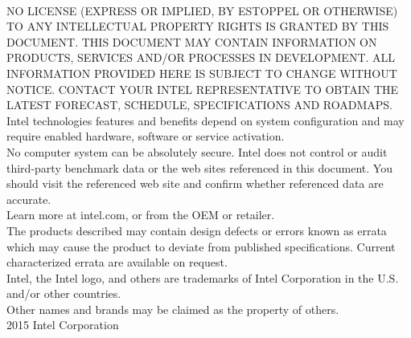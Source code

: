 \newpage

\vspace*{5.0cm}
 \\ 

{\footnotesize

\noindent NO LICENSE (EXPRESS OR IMPLIED, BY ESTOPPEL OR OTHERWISE) TO ANY INTELLECTUAL
PROPERTY RIGHTS IS GRANTED BY THIS DOCUMENT. THIS DOCUMENT MAY CONTAIN
INFORMATION ON PRODUCTS, SERVICES AND/OR PROCESSES IN DEVELOPMENT. ALL
INFORMATION PROVIDED HERE IS SUBJECT TO CHANGE WITHOUT NOTICE. CONTACT YOUR
INTEL REPRESENTATIVE TO OBTAIN THE LATEST FORECAST, SCHEDULE, SPECIFICATIONS
AND ROADMAPS. \\

\noindent Intel technologies features and benefits depend on system
configuration and may require enabled hardware, software or service
activation. \\

\noindent No computer system can be absolutely secure. Intel does not control
or audit third-party benchmark data or the web sites referenced in this
document. You should visit the referenced web site and confirm whether
referenced data are accurate.  \\

\noindent Learn more at intel.com, or from the OEM or retailer. \\

\noindent The products described may contain design defects or errors known as
errata which may cause the product to deviate from published
specifications. Current characterized errata are available on request. \\

\noindent Intel, the Intel logo, and others are trademarks of Intel Corporation
in the U.S. and/or other countries. \\

\noindent *Other names and brands may be claimed as the property of others. \\

\noindent {\small\copyright} 2015 Intel Corporation

}
